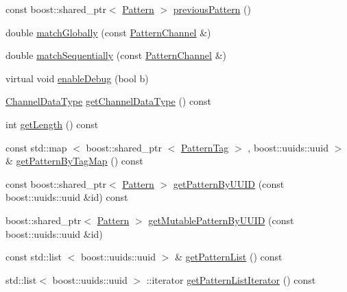 \begin{DoxyCompactItemize}
\item 
const boost\-::shared\-\_\-ptr$<$ \hyperlink{classcryomesh_1_1state_1_1Pattern}{\-Pattern} $>$ \hyperlink{classcryomesh_1_1state_1_1PatternChannel_a4b96871d0a8bf38d6d9a2998dd0a81f7}{previous\-Pattern} ()
\item 
double \hyperlink{classcryomesh_1_1state_1_1PatternChannel_a05400d50d8206b82426bdc8b277c4c14}{match\-Globally} (const \hyperlink{classcryomesh_1_1state_1_1PatternChannel}{\-Pattern\-Channel} \&)
\item 
double \hyperlink{classcryomesh_1_1state_1_1PatternChannel_aa354fc22d88359c3b83d92a224761c69}{match\-Sequentially} (const \hyperlink{classcryomesh_1_1state_1_1PatternChannel}{\-Pattern\-Channel} \&)
\item 
virtual void \hyperlink{classcryomesh_1_1state_1_1PatternChannel_acbaa7ae7afbe42e8ebca56f889220289}{enable\-Debug} (bool b)
\item 
\hyperlink{classcryomesh_1_1state_1_1PatternChannel_ac8a0ae515a221519890fc1181f2c895a}{\-Channel\-Data\-Type} \hyperlink{classcryomesh_1_1state_1_1PatternChannel_ad7890be8253221b14e673c4fb1cddffa}{get\-Channel\-Data\-Type} () const 
\item 
int \hyperlink{classcryomesh_1_1state_1_1PatternChannel_a7ab7d66118f678d1406a14c4ebb79752}{get\-Length} () const 
\item 
const std\-::map\*
$<$ boost\-::shared\-\_\-ptr\*
$<$ \hyperlink{classcryomesh_1_1state_1_1PatternTag}{\-Pattern\-Tag} $>$\*
, boost\-::uuids\-::uuid $>$ \& \hyperlink{classcryomesh_1_1state_1_1PatternChannel_ab5260edbf3ada707a91994c60b866dd5}{get\-Pattern\-By\-Tag\-Map} () const 
\item 
const boost\-::shared\-\_\-ptr$<$ \hyperlink{classcryomesh_1_1state_1_1Pattern}{\-Pattern} $>$ \hyperlink{classcryomesh_1_1state_1_1PatternChannel_a33b3c30b6137eaf727a58cafab32f692}{get\-Pattern\-By\-U\-U\-I\-D} (const boost\-::uuids\-::uuid \&id) const 
\item 
boost\-::shared\-\_\-ptr$<$ \hyperlink{classcryomesh_1_1state_1_1Pattern}{\-Pattern} $>$ \hyperlink{classcryomesh_1_1state_1_1PatternChannel_ad588e65dc12cee6d91bb3035a6958d44}{get\-Mutable\-Pattern\-By\-U\-U\-I\-D} (const boost\-::uuids\-::uuid \&id)
\item 
const std\-::list\*
$<$ boost\-::uuids\-::uuid $>$ \& \hyperlink{classcryomesh_1_1state_1_1PatternChannel_a56b0b495e91692302da543807a93fa02}{get\-Pattern\-List} () const 
\item 
std\-::list$<$ boost\-::uuids\-::uuid $>$\*
\-::iterator \hyperlink{classcryomesh_1_1state_1_1PatternChannel_a79af2f63fa3b5dfa7c48615a47c20842}{get\-Pattern\-List\-Iterator} () const 

\end{DoxyCompactItemize}
